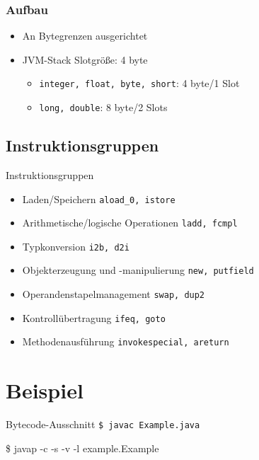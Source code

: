\documentclass[10pt]{beamer}
\begin{document}

\begin{frame}[fragile]
\frametitle{Aufbau}
\begin{itemize}
\item An Bytegrenzen ausgerichtet
\item JVM-Stack Slotgröße: 4 byte
\begin{itemize}
\item {\tt integer, float, byte, short}: 4 byte/1 Slot
\item {\tt long, double}: 8 byte/2 Slots
\end{itemize}
\end{itemize}
\end{frame}


\subsection{Instruktionsgruppen}
\begin{frame}{Instruktionsgruppen}
\begin{itemize}
\item Laden/Speichern \hfill {\tt aload\_0, istore}\;\;\;\pause
\item Arithmetische/logische Operationen \hfill {\tt ladd, fcmpl}\;\;\;\pause
\item Typkonversion \hfill {\tt i2b, d2i}\;\;\;\pause
\item Objekterzeugung und -manipulierung \hfill {\tt new, putfield}\;\;\;\pause
\item Operandenstapelmanagement \hfill {\tt swap, dup2}\;\;\;\pause
\item Kontrollübertragung \hfill {\tt ifeq, goto}\;\;\;\pause
\item Methodenausführung \hfill {\tt invokespecial, areturn}\;\;\;
\end{itemize}
\end{frame}


\section{Beispiel}

\begin{frame}{Bytecode-Ausschnitt}
\tt{\$ javac Example.java}\pause

{\btt\$ javap -c -s -v -l example.Example}
\end{frame}
\end{document}
